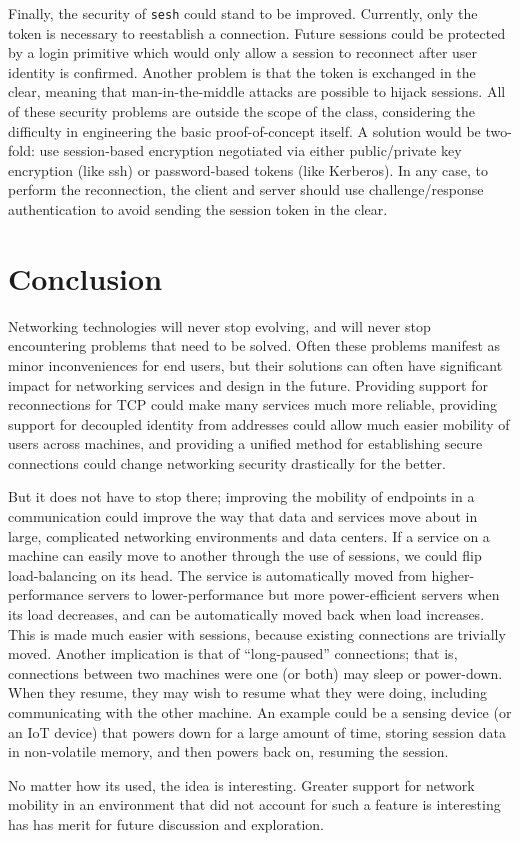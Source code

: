\documentclass[twocolumn,11pt]{article}
\newcommand{\sesh}{\texttt{sesh}\xspace}
\begin{document}
Finally, the security of \sesh could stand to be improved. Currently, only the
token is necessary to reestablish a connection. Future sessions could be
protected by a login primitive which would only allow a session to reconnect
after user identity is confirmed. Another problem is that the token is exchanged
in the clear, meaning that man-in-the-middle attacks are possible to hijack
sessions. All of these security problems are outside the scope of the class,
considering the difficulty in engineering the basic proof-of-concept itself. A
solution would be two-fold: use session-based encryption negotiated via either
public/private key encryption (like ssh) or password-based tokens (like
Kerberos). In any case, to perform the reconnection, the client and server
should use challenge/response authentication to avoid sending the session token
in the clear.

\section{Conclusion}

Networking technologies will never stop evolving, and will never stop
encountering problems that need to be solved. Often these problems manifest as
minor inconveniences for end users, but their solutions can often have
significant impact for networking services and design in the future. Providing
support for reconnections for TCP could make many services much more reliable,
providing support for decoupled identity from addresses could allow much easier
mobility of users across machines, and providing a unified method for
establishing secure connections could change networking security drastically for
the better.

But it does not have to stop there; improving the mobility of
endpoints in a communication could improve the way that data and services move
about in large, complicated networking environments and data centers. If a
service on a machine can easily move to another through the use of sessions, we
could flip load-balancing on its head. The service is automatically moved from
higher-performance servers to lower-performance but more power-efficient servers
when its load decreases, and can be automatically moved back when load
increases. This is made much easier with sessions, because existing connections
are trivially moved. Another implication is that of ``long-paused'' connections;
that is, connections between two machines were one (or both) may sleep or
power-down. When they resume, they may wish to resume what they were doing,
including communicating with the other machine. An example could be a sensing
device (or an IoT device) that powers down for a large amount of time, storing
session data in non-volatile memory, and then powers back on, resuming the
session.

No matter how its used, the idea is interesting. Greater support for network
mobility in an environment that did not account for such a feature is
interesting has has merit for future discussion and exploration.












\end{document}
